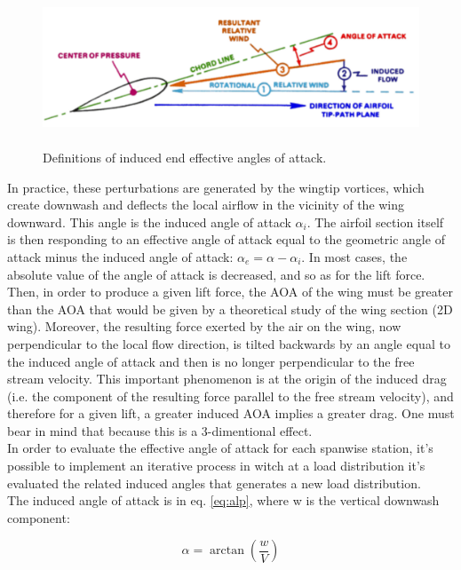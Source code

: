 \begin{figure}[H]
\centering
{\includegraphics[height=3.9cm]{Immagini/induced}} 
\caption{Definitions of induced end effective angles of attack.}
\end{figure}

In practice, these perturbations are generated by the wingtip vortices, which create downwash and deflects the local airflow in the vicinity of the wing downward. This angle is the induced angle of attack $\alpha_i$. The airfoil section itself is then responding to an effective angle of attack equal to the geometric angle of attack minus the induced angle of attack: $\alpha_e=\alpha-\alpha_i$. In most cases, the absolute value of the angle of attack is decreased, and so as for the lift force. Then, in order to produce a given lift force, the AOA of the wing must be greater than the AOA that would be given by a theoretical study of the wing section (2D wing). Moreover, the resulting force exerted by the air on the wing, now perpendicular to the local flow direction, is tilted backwards by an angle equal to the induced angle of attack and then is no longer perpendicular to the free stream velocity. This important phenomenon is at the origin of the induced drag (i.e. the component of the resulting force parallel to the free stream velocity), and therefore for a given lift, a greater induced AOA implies a greater drag. One must bear in mind that because this is a 3-dimentional effect.\cite{induced}\\

In order to evaluate the effective angle of attack  for each spanwise station, it's possible to implement an iterative process in witch at a load distribution it's evaluated the related induced angles that generates a new load distribution.\\
The induced angle of attack is in eq. \ref{eq:alp},  where w is the vertical downwash component:

\begin{equation}
\alpha =\arctan\left( {\frac{w}{V}}\right )
\label{eq:alp}
\end{equation}

